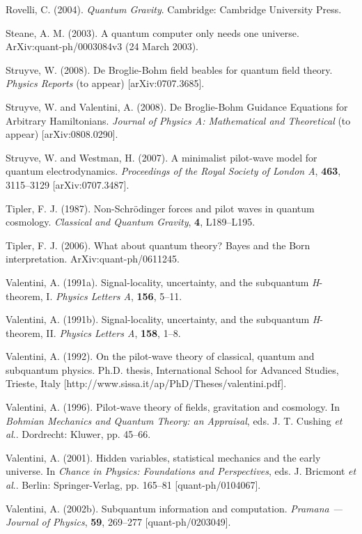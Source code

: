 \documentclass[12pt]{article}%
\begin{document}
Rovelli, C. (2004). \textit{Quantum Gravity}. Cambridge: Cambridge University Press.

Steane, A. M. (2003). A quantum computer only needs one universe.
ArXiv:quant-ph/0003084v3 (24 March 2003).

Struyve, W. (2008). De Broglie-Bohm field beables for quantum field theory.
\textit{Physics Reports} (to appear) [arXiv:0707.3685].

Struyve, W. and Valentini, A. (2008). De Broglie-Bohm Guidance Equations for
Arbitrary Hamiltonians. \textit{Journal of Physics A: Mathematical and
Theoretical} (to appear) [arXiv:0808.0290].

Struyve, W. and Westman, H. (2007). A minimalist pilot-wave model for quantum
electrodynamics. \textit{Proceedings of the Royal Society of London A},
\textbf{463}, 3115--3129 [arXiv:0707.3487].

Tipler, F. J. (1987). Non-Schr\"{o}dinger forces and pilot waves in quantum
cosmology. \textit{Classical and Quantum Gravity}, \textbf{4}, L189--L195.

Tipler, F. J. (2006). What about quantum theory? Bayes and the Born
interpretation. ArXiv:quant-ph/0611245.

Valentini, A. (1991a). Signal-locality, uncertainty, and the subquantum
\textit{H}-theorem, I. \textit{Physics Letters A}, \textbf{156}, 5--11.

Valentini, A. (1991b). Signal-locality, uncertainty, and the subquantum
\textit{H}-theorem, II. \textit{Physics Letters A}, \textbf{158}, 1--8.

Valentini, A. (1992). On the pilot-wave theory of classical, quantum and
subquantum physics. Ph.D. thesis, International School for Advanced Studies,
Trieste, Italy [http://www.sissa.it/ap/PhD/Theses/valentini.pdf].

Valentini, A. (1996). Pilot-wave theory of fields, gravitation and cosmology.
In \textit{Bohmian Mechanics and Quantum Theory: an Appraisal}, eds. J. T.
Cushing \textit{et al}.. Dordrecht: Kluwer, pp. 45--66.

Valentini, A. (2001). Hidden variables, statistical mechanics and the early
universe. In \textit{Chance in Physics: Foundations and Perspectives}, eds. J.
Bricmont \textit{et al}.. Berlin: Springer-Verlag, pp. 165--81 [quant-ph/0104067].

Valentini, A. (2002b). Subquantum information and computation. \textit{Pramana
--- Journal of Physics}, \textbf{59}, 269--277 [quant-ph/0203049].
\end{document}
